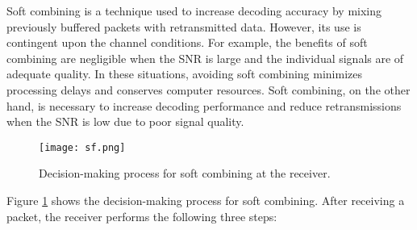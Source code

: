 \documentclass[sn-mathphys-num]{sn-jnl}
\theoremstyle{thmstyleone}
\theoremstyle{thmstyletwo}%
\theoremstyle{thmstylethree}%
\begin{document}
Soft combining is a technique used to increase decoding accuracy by mixing previously buffered packets with retransmitted data. However, its use is contingent upon the channel conditions. For example, the benefits of soft combining are negligible when the SNR is large and the individual signals are of adequate quality. In these situations, avoiding soft combining minimizes processing delays and conserves computer resources. Soft combining, on the other hand, is necessary to increase decoding performance and reduce retransmissions when the SNR is low due to poor signal quality.

\begin{figure}[H]
    \centering
    \texttt{[image: sf.png]}
    \caption{Decision-making process for soft combining at the receiver.}
    \label{fig:8}
\end{figure}

Figure \ref{fig:8} shows the decision-making process for soft combining. After receiving a packet, the receiver performs the following three steps:



    
\end{document}
